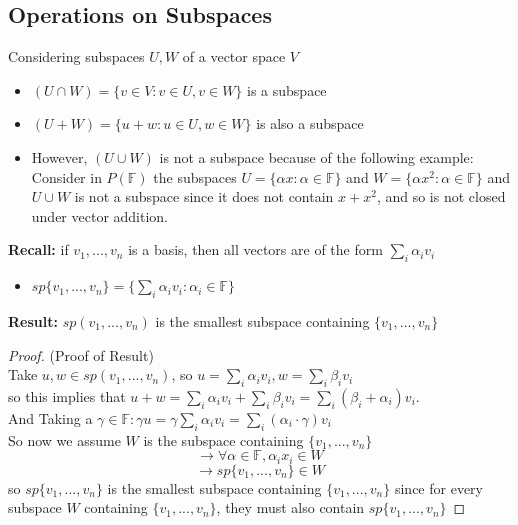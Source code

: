 \documentclass[12pt]{article}
\begin{document}
\subsection{Operations on Subspaces}
Considering subspaces $U,W$ of a vector space $V$
\begin{itemize}
	\item{$(U \cap W) = \{ v \in V : v\in U, v \in W \}$ is a subspace}
	\item{$(U + W) = \{ u+w : u \in U, w \in W \}$ is also a subspace}
	\item{However, $(U \cup W)$ is not a subspace because of the following example:\\
	Consider in $P(\mathbb{F})$ the subspaces $U = \{ \alpha x : \alpha \in \mathbb{F} \}$ and $W = \{ \alpha x^2 : \alpha \in \mathbb{F} \}$} and $U \cup W$ is not a subspace since it does not contain $x + x^2$, and so is not closed under vector addition.
\end{itemize}

\textbf{Recall:} if $v_1, ... , v_n$ is a basis, then all vectors are of the form $\sum_i \alpha_i v_i$
\begin{itemize}
\item{$sp\{v_1, ... , v_n\} = \{ \sum_i \alpha_i v_i : \alpha_i \in \mathbb{F} \}$}
\end{itemize}

\textbf{Result:} $sp(v_1, ... , v_n)$ is the smallest subspace containing $\{v_1, ... , v_n \}$\\
\begin{proof}
	(Proof of Result)\\
	Take $u,w \in sp(v_1, ... , v_n)$, so $u = \sum_i \alpha_i v_i, w = \sum_i \beta_i v_i$\\ so this implies that $u+w = \sum_i \alpha_i v_i + \sum_i \beta_i v_i = \sum_i (\beta_i + \alpha_i) v_i$.\\
	And Taking a $\gamma \in \mathbb{F} : \gamma u = \gamma \sum_i \alpha_i v_i = \sum_i (\alpha_i \cdot \gamma) v_i$\\
	So now we assume $W$ is the subspace containing $\{v_1, ... , v_n \}$\\
	$$\longrightarrow \forall \alpha \in \mathbb{F}, \alpha_i x_i \in W $$
	$$\longrightarrow sp\{v_1, ... , v_n \} \in W$$
	so $sp\{v_1, ... , v_n \}$ is the smallest subspace containing $\{v_1, ... , v_n \}$ since for every subspace $W$ containing $\{v_1, ... , v_n \}$, they must also contain $sp\{v_1, ... , v_n \}$
\end{proof}
\end{document}
